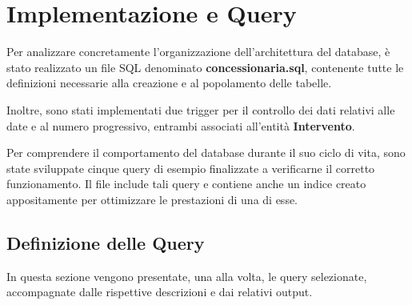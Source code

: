 \vspace{0.5cm}
\section{Implementazione e Query}

Per analizzare concretamente l'organizzazione dell'architettura del database, è stato realizzato un file SQL denominato \textbf{concessionaria.sql}, contenente tutte le definizioni necessarie alla creazione e al popolamento delle tabelle.

Inoltre, sono stati implementati due trigger per il controllo dei dati relativi alle date e al numero progressivo, entrambi associati all'entità \textbf{Intervento}.

Per comprendere il comportamento del database durante il suo ciclo di vita, sono state sviluppate cinque query di esempio finalizzate a verificarne il corretto funzionamento. Il file include tali query e contiene anche un indice creato appositamente per ottimizzare le prestazioni di una di esse.

\subsection{Definizione delle Query}
In questa sezione vengono presentate, una alla volta, le query selezionate, accompagnate dalle rispettive descrizioni e dai relativi output.

